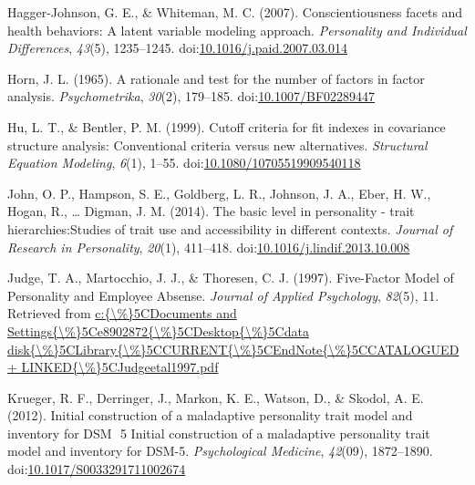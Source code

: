 \documentclass[,man,floatsintext]{apa6}
\begin{document}
\hypertarget{ref-Hagger-Johnson2007}{}
Hagger-Johnson, G. E., \& Whiteman, M. C. (2007). Conscientiousness
facets and health behaviors: A latent variable modeling approach.
\emph{Personality and Individual Differences}, \emph{43}(5), 1235--1245.
doi:\href{https://doi.org/10.1016/j.paid.2007.03.014}{10.1016/j.paid.2007.03.014}

\hypertarget{ref-Horn1965}{}
Horn, J. L. (1965). A rationale and test for the number of factors in
factor analysis. \emph{Psychometrika}, \emph{30}(2), 179--185.
doi:\href{https://doi.org/10.1007/BF02289447}{10.1007/BF02289447}

\hypertarget{ref-Hu1999}{}
Hu, L. T., \& Bentler, P. M. (1999). Cutoff criteria for fit indexes in
covariance structure analysis: Conventional criteria versus new
alternatives. \emph{Structural Equation Modeling}, \emph{6}(1), 1--55.
doi:\href{https://doi.org/10.1080/10705519909540118}{10.1080/10705519909540118}

\hypertarget{ref-Ziegler2014}{}
John, O. P., Hampson, S. E., Goldberg, L. R., Johnson, J. A., Eber, H.
W., Hogan, R., \ldots{} Digman, J. M. (2014). The basic level in
personality - trait hierarchies:Studies of trait use and accessibility
in different contexts. \emph{Journal of Research in Personality},
\emph{20}(1), 411--418.
doi:\href{https://doi.org/10.1016/j.lindif.2013.10.008}{10.1016/j.lindif.2013.10.008}

\hypertarget{ref-Judge1997}{}
Judge, T. A., Martocchio, J. J., \& Thoresen, C. J. (1997). Five-Factor
Model of Personality and Employee Absense. \emph{Journal of Applied
Psychology}, \emph{82}(5), 11. Retrieved from
\href{c:\%7B/\%\%7D5CDocuments\%20and\%20Settings\%7B/\%\%7D5Ce8902872\%7B/\%\%7D5CDesktop\%7B/\%\%7D5Cdata\%20disk\%7B/\%\%7D5CLibrary\%7B/\%\%7D5CCURRENT\%7B/\%\%7D5CEndNote\%7B/\%\%7D5CCATALOGUED\%20+\%20LINKED\%7B/\%\%7D5CJudgeetal1997.pdf}{c:\{\textbackslash{}\%\}5CDocuments and Settings\{\textbackslash{}\%\}5Ce8902872\{\textbackslash{}\%\}5CDesktop\{\textbackslash{}\%\}5Cdata disk\{\textbackslash{}\%\}5CLibrary\{\textbackslash{}\%\}5CCURRENT\{\textbackslash{}\%\}5CEndNote\{\textbackslash{}\%\}5CCATALOGUED + LINKED\{\textbackslash{}\%\}5CJudgeetal1997.pdf}

\hypertarget{ref-Krueger2012a}{}
Krueger, R. F., Derringer, J., Markon, K. E., Watson, D., \& Skodol, A.
E. (2012). Initial construction of a maladaptive personality trait model
and inventory for DSM ­ 5 Initial construction of a maladaptive
personality trait model and inventory for DSM-5. \emph{Psychological
Medicine}, \emph{42}(09), 1872--1890.
doi:\href{https://doi.org/10.1017/S0033291711002674}{10.1017/S0033291711002674}
\end{document}

